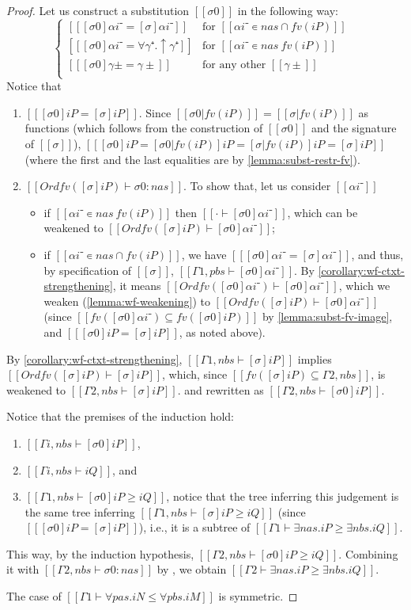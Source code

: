 \begin{proof}
  Let us construct a substitution $[[σ0]]$ in the following way:
  $$
  \begin{cases}
      [[ [σ0]αi⁻ = [σ]αi⁻  ]] & \text{for $[[αi⁻ ∊ {nas} ∩ fv(iP)]]$ }\\
      [[ [σ0]αi⁻ = ∀γ⁺.↑γ⁺ ]] & \text{for $[[αi⁻ ∊ {nas} \ fv(iP)]]$ }\\
      [[ [σ0]γ±  = γ± ]]      & \text{for any other $[[γ±]]$ }\\
  \end{cases}
  $$
  Notice that 
  \begin{enumerate}
    \item $[[ [σ0]iP = [σ]iP ]]$.
      Since $[[σ0|fv(iP)]] = [[σ|fv(iP)]]$ as functions
      (which follows from the construction of 
      $[[σ0]]$ and the signature of $[[σ]]$), 
      $[[ [σ0]iP = [σ0|fv(iP)]iP = [σ|fv(iP)]iP = [σ]iP]]$
      (where the first and the last equalities are by
       \cref{lemma:subst-restr-fv}).

    \item $[[ Ord fv([σ]iP) ⊢ σ0 : nas]]$.
      To show that, let us consider $[[αi⁻]]$ 
      \begin{itemize}
        \item if $[[αi⁻ ∊ {nas} \ fv(iP)]]$ then
          $[[· ⊢ [σ0]αi⁻]]$, which can be weakened to 
          $[[Ord fv([σ]iP) ⊢ [σ0]αi⁻]]$;
        \item if $[[αi⁻ ∊ {nas} ∩ fv(iP)]]$, 
          we have $[[ [σ0]αi⁻ = [σ]αi⁻ ]]$, and thus, by
          specification of $[[σ]]$, $[[Γ1, pbs ⊢ [σ0]αi⁻ ]]$. 
          By \cref{corollary:wf-ctxt-strengthening}, 
          it means $[[Ord fv([σ0]αi⁻) ⊢ [σ0]αi⁻]]$,
          which we weaken (\cref{lemma:wf-weakening}) 
          to $[[Ord fv([σ]iP) ⊢ [σ0]αi⁻]]$ 
          (since $[[fv([σ0]αi⁻) ⊆ fv([σ0]iP)]]$ by \cref{lemma:subst-fv-image},
          and $[[ [σ0]iP = [σ]iP]]$, as noted above).
      \end{itemize} 
  \end{enumerate}

  By \cref{corollary:wf-ctxt-strengthening}, 
  $[[Γ1, nbs ⊢ [σ]iP]]$ implies 
  $[[ Ord fv([σ]iP) ⊢ [σ]iP ]]$, which,
  since $[[fv([σ]iP) ⊆ {Γ2, nbs}]]$,
  is weakened to $[[Γ2, nbs ⊢ [σ]iP]]$.
  and rewritten as $[[Γ2, nbs ⊢ [σ0]iP]]$.
  
  Notice that the premises of the induction hold:
  \begin{enumerate}
    \item $[[Γi, nbs ⊢ [σ0]iP]]$, 
    \item $[[Γi, nbs ⊢ iQ]]$, and
    \item $[[Γ1, nbs ⊢ [σ0]iP ≥ iQ ]]$, 
      notice that the tree inferring this judgement 
      is the same tree inferring $[[Γ1, nbs ⊢ [σ]iP ≥ iQ ]]$ 
      (since $[[ [σ0]iP = [σ]iP]]$), i.e., 
      it is a subtree of $[[Γ1 ⊢ ∃nas.iP ≥ ∃nbs.iQ]]$.
  \end{enumerate}
  This way, by the induction hypothesis,
  $[[Γ2, nbs ⊢ [σ0]iP ≥ iQ ]]$.
  Combining it with $[[ Γ2, nbs ⊢ σ0 : nas]]$
  by ,
  we obtain $[[Γ2 ⊢ ∃nas.iP ≥ ∃nbs.iQ]]$.

  The case of $[[Γ1 ⊢ ∀pas.iN ≤ ∀pbs.iM]]$ is symmetric.
\end{proof}


